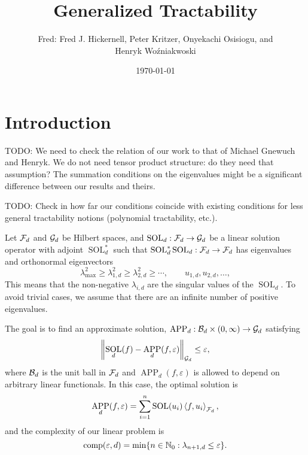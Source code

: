 \documentclass[11pt,a4paper]{article}
\DeclareMathOperator{\SOL}{SOL}
\DeclareMathOperator{\APP}{APP}
\newcommand{\fred}[1]{\begingroup\color{blue}Fred: #1\endgroup}
\newcommand{\peter}[1]{\begingroup\color{purple}#1\endgroup}
\newcommand{\kachi}[1]{\begingroup\color{ForestGreen}#1\endgroup}
\begin{document}
\newtheorem{theorem}{Theorem}
\theoremstyle{definition}
\newtheorem{definition}{Definition}


\title{Generalized Tractability}
\author{\fred{Fred J. Hickernell}, \peter{Peter Kritzer}, \kachi{Onyekachi Osisiogu}, and \\ Henryk Wo\'zniakwoski}
\date{\today}

\maketitle

\section{Introduction}

TODO: We need to check the relation of our work to that of Michael Gnewuch and Henryk. We do not need tensor product structure: do they need that assumption? The summation conditions on the eigenvalues might be a significant difference between our results and theirs.

\medskip

TODO: Check in how far our conditions coincide with existing conditions for less general tractability notions (polynomial tractability, etc.).

\medskip

Let $\mathcal{F}_d$ and $\mathcal{G}_d$ be Hilbert spaces, and $\SOL_d : \cf_d \to \cg_d$ be a linear solution operator with adjoint $\SOL_d^*$ such that $\SOL_d^*\SOL_d : \cf_d \to \cf_d$ has eigenvalues and orthonormal eigenvectors
\[
\lambda_{\max}^2 \ge \lambda_{1,d}^2 \ge \lambda_{2,d}^2 \ge \cdots, \qquad u_{1,d}, u_{2,d}, \ldots,
\]
This means that the non-negative $\lambda_{i,d}$ are the singular values of the $\SOL_d$. To avoid trivial cases, we assume that there are an infinite number of positive eigenvalues.


The goal is to find an approximate solution, $\APP_d:\cb_d \times (0,\infty) \to \cg_d$ satisfying
\[
\norm[\cg_d]{\SOL_d(f) - \APP_d(f,\varepsilon)} \le \varepsilon,
\]
where $\mathcal{B}_d$ is the unit ball in $\mathcal{F}_d$ and $\APP_d(f,\varepsilon)$ is allowed to depend on arbitrary linear functionals.  In this case, the optimal solution is
\[
\APP_d(f,\varepsilon) = \sum_{i=1}^n \SOL(u_i) \ip[\cf_d]{f}{u_i},
\]
and the complexity of our linear problem is
\begin{equation}\label{eq:comp_def}
\operatorname{comp}(\varepsilon, d) = \min \{n \in \mathbb{N}_{0} : \lambda_{n+1, d} \le \varepsilon\}.
\end{equation}
\end{document}
